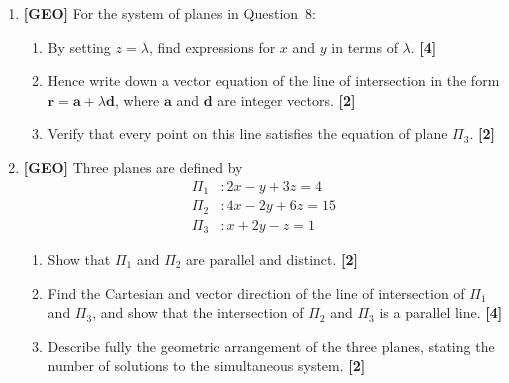\documentclass[11pt,a4paper]{article}
\begin{document}
\begin{enumerate}[resume]
\begin{center}
\end{center}

\item \textbf{[GEO]} For the system of planes in Question~8:
\begin{enumerate}
  \item By setting $z = \lambda$, find expressions for $x$ and $y$ in terms of $\lambda$. \hfill{\small\textbf{[4]}}
  \item Hence write down a vector equation of the line of intersection in the form $\mathbf{r} = \mathbf{a} + \lambda \mathbf{d}$, where $\mathbf{a}$ and $\mathbf{d}$ are integer vectors. \hfill{\small\textbf{[2]}}
  \item Verify that every point on this line satisfies the equation of plane $\Pi_3$. \hfill{\small\textbf{[2]}}
\end{enumerate}

\item \textbf{[GEO]} Three planes are defined by
\[
\begin{aligned}
\Pi_1 &: 2x - y + 3z = 4 \\
\Pi_2 &: 4x - 2y + 6z = 15 \\
\Pi_3 &: x + 2y - z = 1
\end{aligned}
\]
\begin{enumerate}
  \item Show that $\Pi_1$ and $\Pi_2$ are parallel and distinct. \hfill{\small\textbf{[2]}}
  \item Find the Cartesian and vector direction of the line of intersection of $\Pi_1$ and $\Pi_3$, and show that the intersection of $\Pi_2$ and $\Pi_3$ is a parallel line. \hfill{\small\textbf{[4]}}
  \item Describe fully the geometric arrangement of the three planes, stating the number of solutions to the simultaneous system. \hfill{\small\textbf{[2]}}
\end{enumerate}


\end{enumerate}
\end{document}
